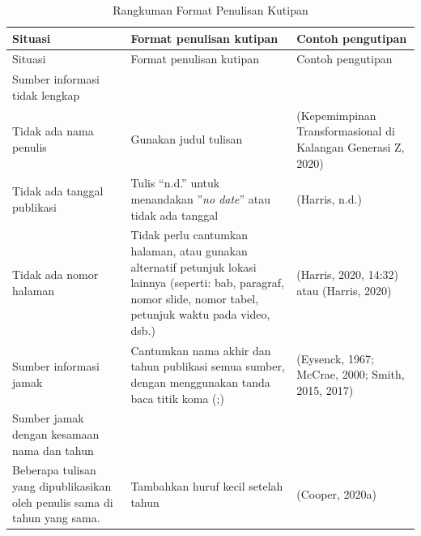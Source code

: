\documentclass[
  indonesian,
  letterpaper,
]{scrbook}
\begin{document}
\begin{longtable}[]{@{}
  >{\raggedright\arraybackslash}p{}
  >{\raggedright\arraybackslash}p{}
  >{\raggedright\arraybackslash}p{}@{}}
\caption{Rangkuman Format Penulisan Kutipan}\tabularnewline
\toprule\noalign{}
\begin{minipage}[b]{\linewidth}\raggedright
Situasi
\end{minipage} & \begin{minipage}[b]{\linewidth}\raggedright
Format penulisan kutipan
\end{minipage} & \begin{minipage}[b]{\linewidth}\raggedright
Contoh pengutipan
\end{minipage} \\
\midrule\noalign{}
\endfirsthead
\toprule\noalign{}
\begin{minipage}[b]{\linewidth}\raggedright
Situasi
\end{minipage} & \begin{minipage}[b]{\linewidth}\raggedright
Format penulisan kutipan
\end{minipage} & \begin{minipage}[b]{\linewidth}\raggedright
Contoh pengutipan
\end{minipage} \\
\midrule\noalign{}
\endhead
\bottomrule\noalign{}
\endlastfoot
Sumber informasi tidak lengkap & & \\
Tidak ada nama penulis & Gunakan judul tulisan & (Kepemimpinan
Transformasional di Kalangan Generasi Z, 2020) \\
Tidak ada tanggal publikasi & Tulis ``n.d.'' untuk menandakan ''\emph{no
date}'' atau tidak ada tanggal & (Harris, n.d.) \\
Tidak ada nomor halaman & Tidak perlu cantumkan halaman, atau gunakan
alternatif petunjuk lokasi lainnya (seperti: bab, paragraf, nomor slide,
nomor tabel, petunjuk waktu pada video, dsb.) & (Harris, 2020, 14:32)
atau (Harris, 2020) \\
Sumber informasi jamak & Cantumkan nama akhir dan tahun publikasi semua
sumber, dengan menggunakan tanda baca titik koma (;) & (Eysenck, 1967;
McCrae, 2000; Smith, 2015, 2017) \\
Sumber jamak dengan kesamaan nama dan tahun & & \\
Beberapa tulisan yang dipublikasikan oleh penulis sama di tahun yang
sama. & Tambahkan huruf kecil setelah tahun & (Cooper, 2020a)


\end{longtable}
\end{document}
